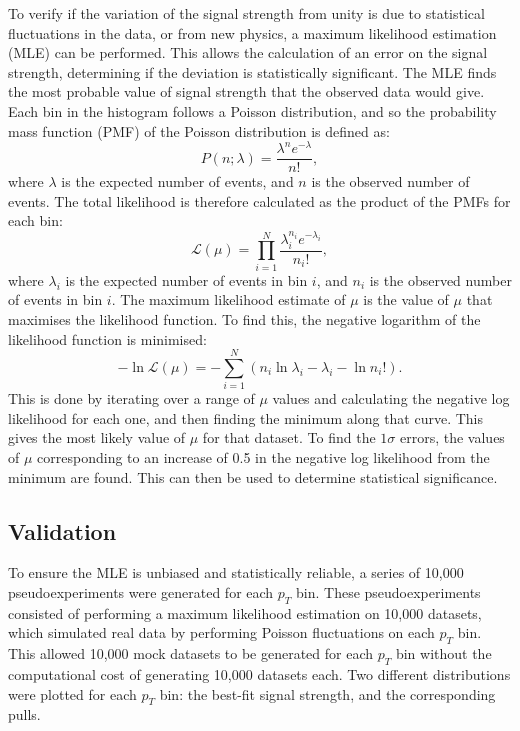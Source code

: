 \documentclass[12pt]{article}
\begin{document}
To verify if the variation of the signal strength from unity is due to statistical fluctuations in the data, or from new physics, a maximum likelihood estimation (MLE) can be performed. This allows the calculation of an error on the signal strength, determining if the deviation is statistically significant. The MLE finds the most probable value of signal strength that the observed data would give. Each bin in the histogram follows a Poisson distribution, and so the probability mass function (PMF) of the Poisson distribution is defined as:
\begin{equation}
    P(n; \lambda) = \frac{\lambda^n e^{-\lambda}}{n!},
\end{equation}
where $\lambda$ is the expected number of events, and $n$ is the observed number of events. The total likelihood is therefore calculated as the product of the PMFs for each bin:
\begin{equation}
    \mathcal{L}(\mu) = \prod_{i=1}^{N} \frac{\lambda_i^{n_i} e^{-\lambda_i}}{n_i!},
\end{equation}
where $\lambda_i$ is the expected number of events in bin $i$, and $n_i$ is the observed number of events in bin $i$. The maximum likelihood estimate of $\mu$ is the value of $\mu$ that maximises the likelihood function. To find this, the negative logarithm of the likelihood function is minimised:
\begin{equation}
    - \ln \mathcal{L}(\mu) = -\sum^{N}_{i=1} \left( n_i \ln \lambda_i - \lambda_i - \ln n_i! \right).
\end{equation}
This is done by iterating over a range of $\mu$ values and calculating the negative log likelihood for each one, and then finding the minimum along that curve. This gives the most likely value of $\mu$ for that dataset. To find the $1\sigma$ errors, the values of $\mu$ corresponding to an increase of 0.5 in the negative log likelihood from the minimum are found. This can then be used to determine statistical significance.

\subsection{Validation}
To ensure the MLE is unbiased and statistically reliable, a series of 10,000 pseudoexperiments were generated for each $p_T$ bin. These pseudoexperiments consisted of performing a maximum likelihood estimation on 10,000 datasets, which simulated real data by performing Poisson fluctuations on each $p_T$ bin. This allowed 10,000 mock datasets to be generated for each $p_T$ bin without the computational cost of generating 10,000 datasets each. Two different distributions were plotted for each $p_T$ bin: the best-fit signal strength, and the corresponding pulls.
\end{document}
